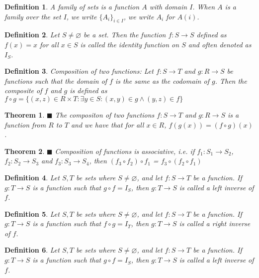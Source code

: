 \documentclass[a4paper]{article}
\newtheorem{mytheorem}{Theorem}
\newtheorem{mydef}{Definition}
\numberwithin{mytheorem}{section}
\numberwithin{mydef}{section}
\numberwithin{axiom}{section}
\numberwithin{example}{section}
\newcommand{\done}{$\blacksquare$ }
\begin{document}
\begin{mydef} A family of sets is a function $A$ with domain $I$. When $A$ is a family over the set $I$, we write $\{A_{i}\}_{i \in I}$, we write $A_{i}$ for $A(i)$.
\end{mydef}

\begin{mydef} Let $S \neq \varnothing$ be a set. Then the function $f: S \rightarrow S$ defined as $f(x) = x$ for all $x \in S$ is called the identity function on $S$ and often denoted as $I_{S}$.
\end{mydef}

\begin{mydef} Composition of two functions: Let $f: S \rightarrow T$ and $g: R \rightarrow S$ be functions such that the domain of $f$ is the same as the codomain of $g$. Then the composite of $f$ and $g$ is defined as $f \circ g = \{ (x,z) \in R \times T : \exists y \in S : (x,y) \in g \wedge (y,z) \in f \} $
\end{mydef}

\begin{mytheorem} \done The compositon of two functions $f: S \rightarrow T$ and $g: R \rightarrow S$ is a function from $R$ to $T$ and we have that for all $x \in R$, $f(g(x)) = (f \circ g)(x)$.
\end{mytheorem}

\begin{mytheorem} \done Composition of functions is associative, i.e. if $f_{1}: S_{1} \rightarrow S_{2}$, $f_{2}: S_{2} \rightarrow S_{3}$ and $f_{3}: S_{3} \rightarrow S_{4}$, then $(f_{3} \circ f_{2}) \circ f_{1}$ = $f_{3} \circ (f_{2} \circ f_{1})$
\end{mytheorem}

\begin{mydef} Let $S,T$ be sets where $S \neq \varnothing$, and let $f: S \rightarrow T$ be a function. If $g: T \rightarrow S$ is a function such that $g \circ f = I_{S}$, then $g: T \rightarrow S$ is called a left inverse of $f$. 
\end{mydef}

\begin{mydef} Let $S,T$ be sets where $S \neq \varnothing$, and let $f: S \rightarrow T$ be a function. If $g: T \rightarrow S$ is a function such that $f \circ g = I_{T}$, then $g: T \rightarrow S$ is called a right inverse of $f$. 
\end{mydef}

\begin{mydef} Let $S,T$ be sets where $S \neq \varnothing$, and let $f: S \rightarrow T$ be a function. If $g: T \rightarrow S$ is a function such that $g \circ f = I_{S}$, then $g: T \rightarrow S$ is called a left inverse of $f$. 
\end{mydef}
\end{document}
